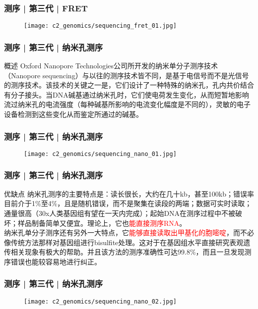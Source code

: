 \begin{frame}
  \frametitle{测序 | 第三代 | FRET}
  \begin{figure}
    \centering
    \texttt{[image: c2\_genomics/sequencing\_fret\_01.jpg]}
  \end{figure}
\end{frame}

\begin{frame}
  \frametitle{测序 | 第三代 | \alert{纳米孔测序}}
  \begin{block}{概述}
Oxford Nanopore Technologies公司所开发的纳米单分子测序技术（Nanopore sequencing）与以往的测序技术皆不同，是基于电信号而不是光信号的测序技术。该技术的关键之一是，它们设计了一种特殊的纳米孔，孔内共价结合有分子接头。当DNA碱基通过纳米孔时，它们使电荷发生变化，从而短暂地影响流过纳米孔的电流强度（每种碱基所影响的电流变化幅度是不同的），灵敏的电子设备检测到这些变化从而鉴定所通过的碱基。
  \end{block}
\end{frame}

\begin{frame}
  \frametitle{测序 | 第三代 | 纳米孔测序}
  \begin{figure}
    \centering
    \texttt{[image: c2\_genomics/sequencing\_nano\_01.jpg]}
  \end{figure}
\end{frame}

\begin{frame}
  \frametitle{测序 | 第三代 | 纳米孔测序}
  \begin{block}{优缺点}
纳米孔测序的主要特点是：读长很长，大约在几十kb，甚至100kb；错误率目前介于1\%至4\%，且是随机错误，而不是聚集在读段的两端；数据可实时读取；通量很高（30x人类基因组有望在一天内完成）；起始DNA在测序过程中不被破坏；样品制备简单又便宜。理论上，它也\textcolor{red}{能直接测序RNA}。\\
\vspace{1em}
纳米孔单分子测序还有另外一大特点，它\textcolor{red}{能够直接读取出甲基化的胞嘧啶}，而不必像传统方法那样对基因组进行bisulfite处理。这对于在基因组水平直接研究表观遗传相关现象有极大的帮助。并且该方法的测序准确性可达99.8\%，而且一旦发现测序错误也能较容易地进行纠正。
  \end{block}
\end{frame}

\begin{frame}
  \frametitle{测序 | 第三代 | 纳米孔测序}
  \begin{figure}
    \centering
    \texttt{[image: c2\_genomics/sequencing\_nano\_02.jpg]}
  \end{figure}
\end{frame}

